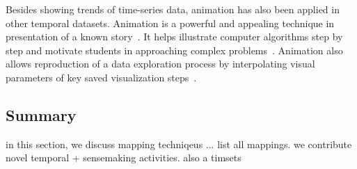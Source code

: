 Besides showing trends of time-series data, animation has also been applied in other temporal datasets. Animation is a powerful and appealing technique in presentation of a known story~\cite{Gershon2001}. It helps illustrate computer algorithms step by step and motivate students in approaching complex problems~\cite{Kehoe2001}. Animation also allows reproduction of a data exploration process by interpolating visual parameters of key saved visualization steps~\cite{Ma1999}.

\subsection{Summary}
in this section, we discuss mapping techniqeus ... list all mappings. we contribute novel temporal + sensemaking activities. also a timsets
